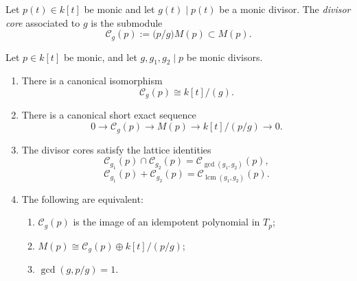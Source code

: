 \begin{definition}
Let \(p(t)\in k[t]\) be monic and let \(g(t)\mid p(t)\) be a monic divisor.
The \emph{divisor core} associated to \(g\) is the submodule
\[
\mathcal C_g(p):=\bigl(p/g\bigr)M(p)\subset M(p).
\]
\end{definition}

\begin{theorem}
\ClaimStatusProvedHere
\label{thm:divisor-core-calculus}
Let \(p\in k[t]\) be monic, and let \(g,g_1,g_2\mid p\) be monic divisors.

\begin{enumerate}[label=\textup{(\roman*)}]
\item There is a canonical isomorphism
\[
\mathcal C_g(p)\cong k[t]/(g).
\]

\item There is a canonical short exact sequence
\[
0\longrightarrow \mathcal C_g(p)\longrightarrow M(p)\longrightarrow k[t]/(p/g)\longrightarrow 0.
\]

\item The divisor cores satisfy the lattice identities
\[
\mathcal C_{g_1}(p)\cap \mathcal C_{g_2}(p)=\mathcal C_{\gcd(g_1,g_2)}(p),
\]
\[
\mathcal C_{g_1}(p)+\mathcal C_{g_2}(p)=\mathcal C_{\operatorname{lcm}(g_1,g_2)}(p).
\]

\item The following are equivalent:
\begin{enumerate}[label=\textup{(\alph*)}]
\item \(\mathcal C_g(p)\) is the image of an idempotent polynomial in \(T_p\);
\item \(M(p)\cong \mathcal C_g(p)\oplus k[t]/(p/g)\);
\item \(\gcd(g,p/g)=1\).
\end{enumerate}
\end{enumerate}
\end{theorem}


